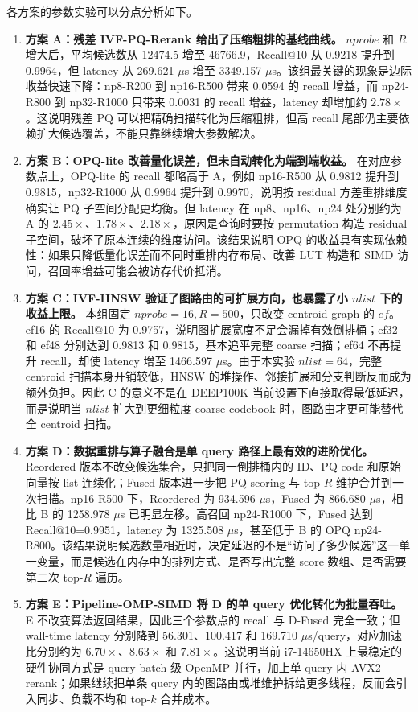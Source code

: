 \documentclass[a4paper]{article}
\begin{document}
各方案的参数实验可以分点分析如下。
\begin{enumerate}
\item \textbf{方案 A：残差 IVF-PQ-Rerank 给出了压缩粗排的基线曲线。} $nprobe$ 和 $R$ 增大后，平均候选数从 12474.5 增至 46766.9，Recall@10 从 0.9218 提升到 0.9964，但 latency 从 269.621 $\mu$s 增至 3349.157 $\mu$s。该组最关键的现象是边际收益快速下降：np8-R200 到 np16-R500 带来 0.0594 的 recall 增益，而 np24-R800 到 np32-R1000 只带来 0.0031 的 recall 增益，latency 却增加约 $2.78\times$。这说明残差 PQ 可以把精确扫描转化为压缩粗排，但高 recall 尾部仍主要依赖扩大候选覆盖，不能只靠继续增大参数解决。
\item \textbf{方案 B：OPQ-lite 改善量化误差，但未自动转化为端到端收益。} 在对应参数点上，OPQ-lite 的 recall 都略高于 A，例如 np16-R500 从 0.9812 提升到 0.9815，np32-R1000 从 0.9964 提升到 0.9970，说明按 residual 方差重排维度确实让 PQ 子空间分配更均衡。但 latency 在 np8、np16、np24 处分别约为 A 的 $2.45\times$、$1.78\times$、$2.18\times$，原因是查询时要按 permutation 构造 residual 子空间，破坏了原本连续的维度访问。该结果说明 OPQ 的收益具有实现依赖性：如果只降低量化误差而不同时重排内存布局、改善 LUT 构造和 SIMD 访问，召回率增益可能会被访存代价抵消。
\item \textbf{方案 C：IVF-HNSW 验证了图路由的可扩展方向，也暴露了小 $nlist$ 下的收益上限。} 本组固定 $nprobe=16,R=500$，只改变 centroid graph 的 $ef$。ef16 的 Recall@10 为 0.9757，说明图扩展宽度不足会漏掉有效倒排桶；ef32 和 ef48 分别达到 0.9813 和 0.9815，基本追平完整 coarse 扫描；ef64 不再提升 recall，却使 latency 增至 1466.597 $\mu$s。由于本实验 $nlist=64$，完整 centroid 扫描本身开销较低，HNSW 的堆操作、邻接扩展和分支判断反而成为额外负担。因此 C 的意义不是在 DEEP100K 当前设置下直接取得最低延迟，而是说明当 $nlist$ 扩大到更细粒度 coarse codebook 时，图路由才更可能替代全 centroid 扫描。
\item \textbf{方案 D：数据重排与算子融合是单 query 路径上最有效的进阶优化。} Reordered 版本不改变候选集合，只把同一倒排桶内的 ID、PQ code 和原始向量按 list 连续化；Fused 版本进一步把 PQ scoring 与 top-$R$ 维护合并到一次扫描。np16-R500 下，Reordered 为 934.596 $\mu$s，Fused 为 866.680 $\mu$s，相比 B 的 1258.978 $\mu$s 已明显左移。高召回 np24-R1000 下，Fused 达到 Recall@10=0.9951，latency 为 1325.508 $\mu$s，甚至低于 B 的 OPQ np24-R800。该结果说明候选数量相近时，决定延迟的不是“访问了多少候选”这一单一变量，而是候选在内存中的排列方式、是否写出完整 score 数组、是否需要第二次 top-$R$ 遍历。
\item \textbf{方案 E：Pipeline-OMP-SIMD 将 D 的单 query 优化转化为批量吞吐。} E 不改变算法返回结果，因此三个参数点的 recall 与 D-Fused 完全一致；但 wall-time latency 分别降到 56.301、100.417 和 169.710 $\mu$s/query，对应加速比分别约为 $6.70\times$、$8.63\times$ 和 $7.81\times$。这说明当前 i7-14650HX 上最稳定的硬件协同方式是 query batch 级 OpenMP 并行，加上单 query 内 AVX2 rerank；如果继续把单条 query 内的图路由或堆维护拆给更多线程，反而会引入同步、负载不均和 top-$k$ 合并成本。
\end{enumerate}
\end{document}
